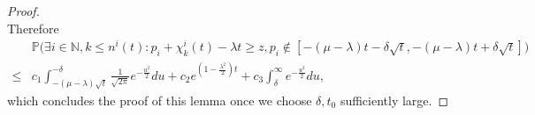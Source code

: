 \documentclass[10pt,a4paper]{amsart}
\begin{document}
\begin{proof}
\begin{equation}
  \end{equation}
  Therefore
     \begin{align*}
      &\mathbb{P} \biggl(\exists i\in \mathbb N, k \le n^{i}(t):p_{i}+\chi_k^i(t)-\lambda t \ge z,p_i\notin[-(\mu - \lambda)t-\delta\sqrt{t},-(\mu -\lambda)t+\delta\sqrt{t}]\biggr)\\
  \le&c_{1}\int_{-(\mu-\lambda)\sqrt{t}}^{-\delta}\frac{1}{\sqrt{2\pi}}e^{-\frac{u^{2}}{2}}du +c_{2}e^{(1-\frac{\lambda^{2}}{2})t}+ c_{3}\int_{\delta}^{\infty}e^{-\frac{u^{2}}{2}}du,
     \end{align*}
which concludes the proof of this lemma once we choose $\delta, t_0$ sufficiently large.
\end{proof}
\end{document}
